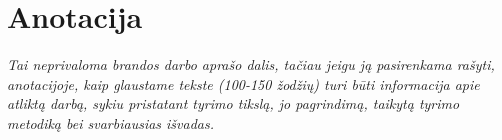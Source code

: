 \newpage
\section{Anotacija}
\textit{Tai neprivaloma brandos darbo aprašo dalis, tačiau jeigu ją pasirenkama rašyti, anotacijoje, kaip glaustame tekste (100-150 žodžių) turi būti informacija apie atliktą darbą, sykiu pristatant tyrimo tikslą, jo pagrindimą, taikytą tyrimo metodiką bei svarbiausias išvadas.}\par
\lipsum[1]